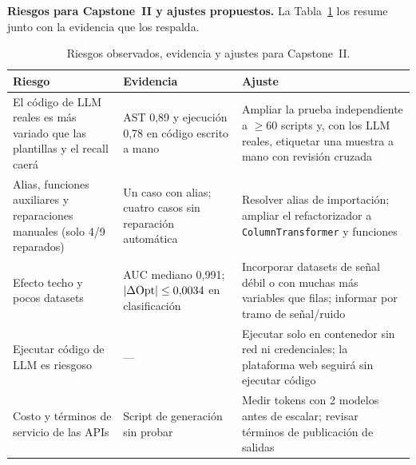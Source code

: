 \textbf{Riesgos para Capstone~II y ajustes propuestos.} La Tabla~\ref{tab:riesgos} los resume junto con la evidencia que los respalda.

\begin{table}[H]
\centering
\caption{Riesgos observados, evidencia y ajustes para Capstone~II.}
\label{tab:riesgos}
\begingroup\footnotesize\singlespacing
\begin{tabular}{@{}p{4.4cm} p{4.0cm} p{6.6cm}@{}}
\toprule
Riesgo & Evidencia & Ajuste \\
\midrule
El código de LLM reales es más variado que las plantillas y el recall caerá & AST 0,89 y ejecución 0,78 en código escrito a mano & Ampliar la prueba independiente a $\geq 60$ scripts y, con los LLM reales, etiquetar una muestra a mano con revisión cruzada \\
Alias, funciones auxiliares y reparaciones manuales (solo 4/9 reparados) & Un caso con alias; cuatro casos sin reparación automática & Resolver alias de importación; ampliar el refactorizador a \texttt{ColumnTransformer} y funciones \\
Efecto techo y pocos datasets & AUC mediano 0,991; $|\Delta\mathrm{Opt}|\leq 0{,}0034$ en clasificación & Incorporar datasets de señal débil o con muchas más variables que filas; informar \DOpt{} por tramo de señal/ruido \\
Ejecutar código de LLM es riesgoso & --- & Ejecutar solo en contenedor sin red ni credenciales; la plataforma web seguirá sin ejecutar código \\
Costo y términos de servicio de las APIs & Script de generación sin probar & Medir tokens con 2 modelos antes de escalar; revisar términos de publicación de salidas \\
\bottomrule
\end{tabular}
\endgroup
\end{table}
